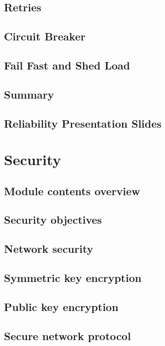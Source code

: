 \documentclass[11pt]{article}
\begin{document}
\section{Retries}

\section{Circuit Breaker}

\section{Fail Fast and Shed Load}

\section{Summary}

\section{Reliability Presentation Slides}

\chapter{Security}

\section{Module contents overview}

\section{Security objectives}

\section{Network security}

\section{Symmetric key encryption}

\section{Public key encryption}

\section{Secure network protocol}
\end{document}
